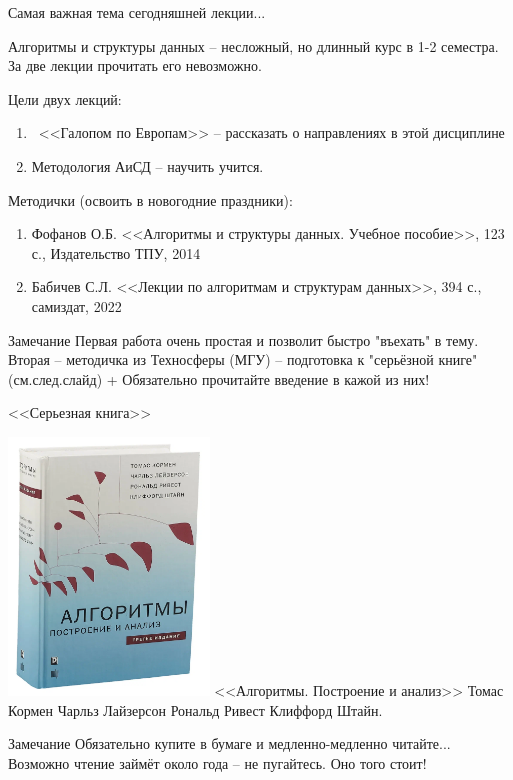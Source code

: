 \begin{frame}{Самая важная тема сегодняшней лекции...}
\end{frame}


\begin{frame}
\footnotesize
Алгоритмы и структуры данных -- несложный, но длинный курс в 1-2 семестра. 
За две лекции прочитать его невозможно. 

Цели двух лекций:
\begin{enumerate}
	\item ~<<Галопом по Европам>> -- рассказать о направлениях в этой дисциплине
	\item Методология АиСД -- научить учится.
\end{enumerate}

Методички (освоить в новогодние праздники):
\begin{enumerate}
	\item Фофанов О.Б. <<Алгоритмы и структуры данных. Учебное пособие>>, 123 с., Издательство ТПУ, 2014
	\item Бабичев С.Л. <<Лекции по алгоритмам и структурам данных>>, 394 с., самиздат, 2022
\end{enumerate}

\begin{block}{Замечание}
Первая работа очень простая и позволит быстро "въехать" в тему. 
Вторая -- методичка из Техносферы (МГУ) -- подготовка к "серьёзной книге" (см.след.слайд)
+ Обязательно прочитайте введение в кажой из них!
\end{block}

\end{frame}


\begin{frame}{<<Серьезная книга>>}


\includegraphics[width=0.4\textwidth]{./../pic/Kormen_3_edition_book_img.png}
<<Алгоритмы. Построение и анализ>>
Томас Кормен
Чарльз Лайзерсон
Рональд Ривест
Клиффорд Штайн.

\begin{block}{Замечание}
	Обязательно купите в бумаге 
	и медленно-медленно читайте...
	Возможно чтение займёт около года -- не пугайтесь. Оно того стоит!
\end{block}

\end{frame}



